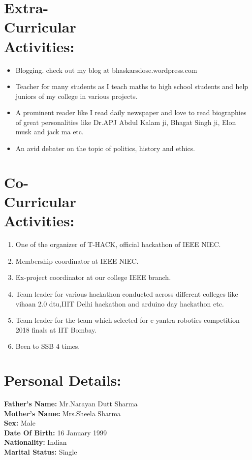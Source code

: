 \documentclass[10pt]{report}
\begin{document}
\section*{Extra-\\Curricular\\Activities:} %
\begin{itemize}
	\item Blogging. check out my blog at bhaskarsdose.wordpress.com
	\item Teacher for many students as I teach maths to high school students and help juniors of my college in various projects.
	\item A prominent reader like I read daily newspaper and love to read biographies of great personalities like Dr.APJ Abdul Kalam ji, Bhagat Singh ji, Elon musk and jack ma etc.
	\item An avid debater on the topic of politics, history and ethics.
\end{itemize}

\section*{Co-\\Curricular\\Activities:}%
\begin{enumerate}
	\item One of the organizer of T-HACK, official hackathon of IEEE NIEC.
	\item Membership coordinator at IEEE NIEC.
	\item Ex-project coordinator at our college IEEE branch. 
	\item Team leader for various hackathon conducted across different colleges like vihaan 2.0 dtu,IIIT Delhi hackathon and arduino day hackathon etc.
	\item Team leader for the team which selected for e yantra robotics competition 2018 finals at IIT Bombay.
	\item Been to SSB 4 times.
\end{enumerate}

\section*{Personal Details:}%
\textbf{Father's Name:} Mr.Narayan Dutt Sharma\\
\textbf{Mother's Name:} Mrs.Sheela Sharma\\
\textbf{Sex:} Male\\
\textbf{Date Of Birth:} 16 January 1999\\
\textbf{Nationality:} Indian\\
\textbf{Marital Status:} Single
\end{document}
